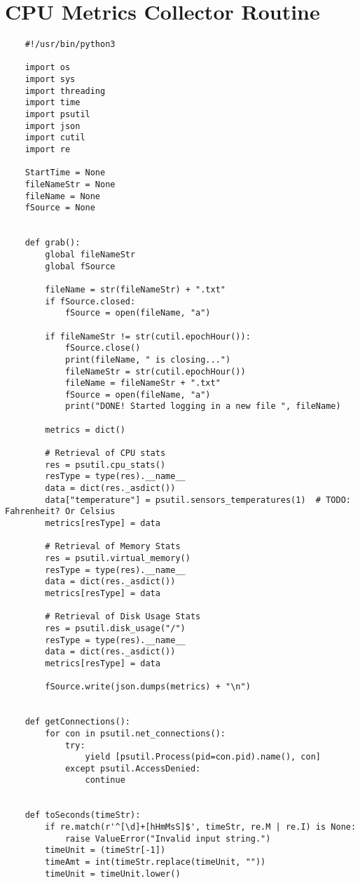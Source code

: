 \chapter{CPU Metrics Collector Routine}\label{adx:grabber}
\begin{code}
    \begin{verbatim}
    #!/usr/bin/python3
    
    import os
    import sys
    import threading
    import time
    import psutil
    import json
    import cutil
    import re
    
    StartTime = None
    fileNameStr = None
    fileName = None
    fSource = None
    
    
    def grab():
    	global fileNameStr
    	global fSource
    
    	fileName = str(fileNameStr) + ".txt"
    	if fSource.closed:
    		fSource = open(fileName, "a")
    
    	if fileNameStr != str(cutil.epochHour()):
    		fSource.close()
    		print(fileName, " is closing...")
    		fileNameStr = str(cutil.epochHour())
    		fileName = fileNameStr + ".txt"
    		fSource = open(fileName, "a")
    		print("DONE! Started logging in a new file ", fileName)
    
    	metrics = dict()
    
    	# Retrieval of CPU stats
    	res = psutil.cpu_stats()
    	resType = type(res).__name__
    	data = dict(res._asdict())
    	data["temperature"] = psutil.sensors_temperatures(1)  # TODO: Fahrenheit? Or Celsius
    	metrics[resType] = data
    
    	# Retrieval of Memory Stats
    	res = psutil.virtual_memory()
    	resType = type(res).__name__
    	data = dict(res._asdict())
    	metrics[resType] = data
    
    	# Retrieval of Disk Usage Stats
    	res = psutil.disk_usage("/")
    	resType = type(res).__name__
    	data = dict(res._asdict())
    	metrics[resType] = data
    
    	fSource.write(json.dumps(metrics) + "\n")
    
    
    def getConnections():
    	for con in psutil.net_connections():
    		try:
    			yield [psutil.Process(pid=con.pid).name(), con]
    		except psutil.AccessDenied:
    			continue
    
    
    def toSeconds(timeStr):
    	if re.match(r'^[\d]+[hHmMsS]$', timeStr, re.M | re.I) is None:
    		raise ValueError("Invalid input string.")
    	timeUnit = (timeStr[-1])
    	timeAmt = int(timeStr.replace(timeUnit, ""))
    	timeUnit = timeUnit.lower()
    

\end{verbatim}
\end{code}
